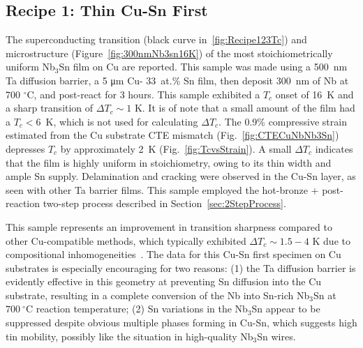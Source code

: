     

    \subsection{Recipe 1: Thin Cu-Sn First}

    The superconducting transition (black curve in~\ref{fig:Recipe123Tc}) and microstructure (Figure~\ref{fig:300nmNb3sn16K}) of the most stoichiometrically uniform Nb$_3$Sn film on Cu are reported. This sample was made using a 500~nm Ta diffusion barrier, a 5 \unit{\um} Cu- 33~at.\% Sn film, then deposit 300~nm of Nb at 700 $^\circ$C, and post-react for 3 hours. This sample exhibited a $T_c$ onset of 16~K and a sharp transition of $\Delta T_c\sim1$ K. It is of note that a small amount of the film had a $T_c < 6$~K, which is not used for calculating $\Delta T_c$. The 0.9\% compressive strain estimated from the Cu substrate CTE mismatch (Fig.~\ref{fig:CTECuNbNb3Sn}) depresses $T_c$ by approximately 2~K (Fig.~\ref{fig:TcvsStrain}). A small $\Delta T_c$ indicates that the film is highly uniform in stoichiometry, owing to its thin width and ample Sn supply. Delamination and cracking were observed in the Cu-Sn layer, as seen with other Ta barrier films. This sample employed the hot-bronze + post-reaction two-step process described in Section~\ref{sec:2StepProcess}.

    This sample represents an improvement in transition sharpness compared to other Cu-compatible methods, which typically exhibited $\Delta T_c\sim 1.5-4$ K due to compositional inhomogeneities~\cite{fonnesuRecipeOptimizationSRF2025, luImpactCuSn2025}. The data for this Cu-Sn first specimen on Cu substrates is especially encouraging for two reasons: (1) the Ta diffusion barrier is evidently effective in this geometry at preventing Sn diffusion into the Cu substrate, resulting in a complete conversion of the Nb into Sn-rich Nb$_3$Sn at $700~^\circ$C reaction temperature; (2) Sn variations in the Nb$_3$Sn appear to be suppressed despite obvious multiple phases forming in Cu-Sn, which suggests high tin mobility, possibly like the situation in high-quality Nb$_3$Sn wires.

